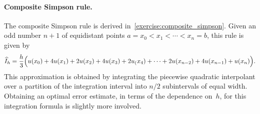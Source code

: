 \paragraph{Composite Simpson rule.}
The composite Simpson rule is derived in~\cref{exercise:composite_simpson}.
Given an odd number $n+1$ of equidistant points $a = x_0 < x_1 < \dotsb < x_n = b$,
this rule is given by
\begin{equation}
    \label{eq:composite_simpson}
    \widehat I_h = \frac{h}{3} \Bigl( u(x_0) + 4 u(x_1) + 2 u(x_2) + 4 u(x_3) + 2 u_(x_4) + \dotsb + 2 u(x_{n-2}) + 4 u(x_{n-1}) + u(x_n)\Bigr).
\end{equation}
This approximation is obtained by integrating the piecewise quadratic interpolant
over a partition of the integration interval into $n/2$ subintervals of equal width.
Obtaining an optimal error estimate,
in terms of the dependence on~$h$,
for this integration formula is slightly more involved.

